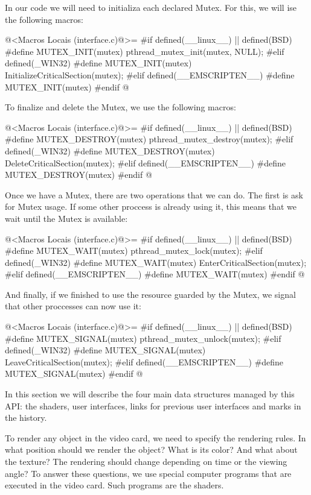 In our code we will need to initializa each declared Mutex. For this,
we will ise the following macros:

\iniciocodigo
@<Macros Locais (interface.c)@>=
#if defined(__linux__) || defined(BSD)
#define MUTEX_INIT(mutex) pthread_mutex_init(mutex, NULL);
#elif defined(_WIN32)
#define MUTEX_INIT(mutex) InitializeCriticalSection(mutex);
#elif defined(__EMSCRIPTEN__)
#define MUTEX_INIT(mutex)
#endif
@
\fimcodigo

To finalize and delete the Mutex, we use the following macros:

\iniciocodigo
@<Macros Locais (interface.c)@>=
#if defined(__linux__) || defined(BSD)
#define MUTEX_DESTROY(mutex) pthread_mutex_destroy(mutex);
#elif defined(_WIN32)
#define MUTEX_DESTROY(mutex) DeleteCriticalSection(mutex);
#elif defined(__EMSCRIPTEN__)
#define MUTEX_DESTROY(mutex)
#endif
@
\fimcodigo

Once we have a Mutex, there are two operations that we can do. The
first is ask for Mutex usage. If some other proccess is already using
it, this means that we wait until the Mutex is available:

\iniciocodigo
@<Macros Locais (interface.c)@>=
#if defined(__linux__) || defined(BSD)
#define MUTEX_WAIT(mutex) pthread_mutex_lock(mutex);
#elif defined(_WIN32)
#define MUTEX_WAIT(mutex) EnterCriticalSection(mutex);
#elif defined(__EMSCRIPTEN__)
#define MUTEX_WAIT(mutex)
#endif
@
\fimcodigo

And finally, if we finished to use the resource guarded by the Mutex,
we signal that other proccesses can now use it:

\iniciocodigo
@<Macros Locais (interface.c)@>=
#if defined(__linux__) || defined(BSD)
#define MUTEX_SIGNAL(mutex) pthread_mutex_unlock(mutex);
#elif defined(_WIN32)
#define MUTEX_SIGNAL(mutex) LeaveCriticalSection(mutex);
#elif defined(__EMSCRIPTEN__)
#define MUTEX_SIGNAL(mutex)
#endif
@
\fimcodigo


In this section we will describe the four main data structures managed
by this API: the shaders, user interfaces, links for previous user
interfaces and marks in the history.


To render any object in the video card, we need to specify the
rendering rules. In what position should we render the object? What is
its color? And what about the texture? The rendering should change
depending on time or the viewing angle? To answer these questions, we
use special computer programs that are executed in the video
card. Such programs are the shaders.

